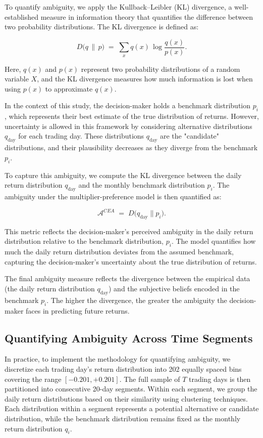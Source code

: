 \documentclass[preprint,12pt,authoryear]{elsarticle}
\begin{document}
To quantify ambiguity, we apply the Kullback--Leibler (KL) divergence, a well-established measure in information theory that quantifies the difference between two probability distributions. The KL divergence is defined as:

\[
D\bigl(q \,\|\, p\bigr) \;=\; \sum_{x} q(x)\,\log\!\frac{q(x)}{p(x)}.
\]

Here, \(q(x)\) and \(p(x)\) represent two probability distributions of a random variable \(X\), and the KL divergence measures how much information is lost when using \(p(x)\) to approximate \(q(x)\).

In the context of this study, the decision-maker holds a benchmark distribution \(p_i\), which represents their best estimate of the true distribution of returns. However, uncertainty is allowed in this framework by considering alternative distributions \(q_{\text{day}}\) for each trading day. These distributions \(q_{\text{day}}\) are the "candidate" distributions, and their plausibility decreases as they diverge from the benchmark \(p_i\).

To capture this ambiguity, we compute the KL divergence between the daily return distribution \(q_{\text{day}}\) and the monthly benchmark distribution \(p_i\). The ambiguity under the multiplier-preference model is then quantified as:

\[
\mathcal{A}^{CEA} \;=\; D\bigl(q_{\mathrm{day}} \parallel p_i\bigr).
\]

This metric reflects the decision-maker's perceived ambiguity in the daily return distribution relative to the benchmark distribution, \(p_i\). The model quantifies how much the daily return distribution deviates from the assumed benchmark, capturing the decision-maker's uncertainty about the true distribution of returns.

The final ambiguity measure reflects the divergence between the empirical data (the daily return distribution \(q_{\text{day}}\)) and the subjective beliefs encoded in the benchmark \(p_i\). The higher the divergence, the greater the ambiguity the decision-maker faces in predicting future returns.

\subsection{Quantifying Ambiguity Across Time Segments}

In practice, to implement the methodology for quantifying ambiguity, we discretize each trading day's return distribution into 202 equally spaced bins covering the range \([-0.201, +0.201]\). The full sample of \(T\) trading days is then partitioned into consecutive 20-day segments. Within each segment, we group the daily return distributions based on their similarity using clustering techniques. Each distribution within a segment represents a potential alternative or candidate distribution, while the benchmark distribution remains fixed as the monthly return distribution \(q_i\).
\end{document}
